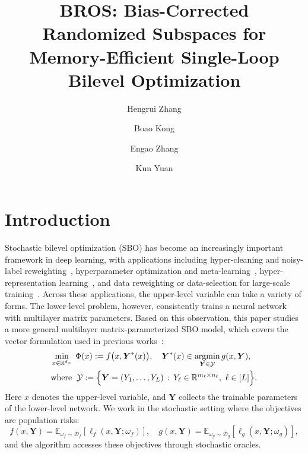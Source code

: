 \documentclass{pkumelon}
\title{BROS: Bias-Corrected Randomized Subspaces for Memory-Efficient Single-Loop Bilevel Optimization}
\author[1,*]{Hengrui Zhang}
\author[2,*]{Boao Kong}
\author[2,*]{Engao Zhang}
\author[2,\P]{Kun Yuan}
\affiliation[1]{Sichuan University}
\affiliation[2]{Peking University}
\theoremstyle{plain}
\DeclareMathOperator{\argmin}{argmin}
\begin{document}
\maketitle

\section{Introduction}
\label{sec:intro}

Stochastic bilevel optimization (SBO) has become an increasingly important framework in deep learning, with applications including hyper-cleaning and noisy-label reweighting~\citep{hao2024bilevel,yang2024tuning,tu2023learning,zheng2021meta}, hyperparameter optimization and meta-learning~\citep{franceschi2018bilevel,shaban2019truncated,chen2024optimal}, hyper-representation learning~\citep{huang2024optimal,yang2025first}, and data reweighting or data-selection for large-scale training~\citep{fan2023doge,xie2023doremi,shen2024seal,pan2025scalebio,wang2026draw}. Across these applications, the upper-level variable can take a variety of forms. The lower-level problem, however, consistently trains a neural network with multilayer matrix parameters. Based on this observation, this paper studies a more general multilayer matrix-parameterized SBO model, which covers the vector formulation used in previous works~\citep{ghadimi2018approximation,dagreou2022framework,chen2024optimal,chu2024spaba}:
\begin{subequations} \label{eq:intro-problem}
\begin{align}
  &\min_{x\in\mathbb{R}^{d_x}}\; \Phi(x) := f\bigl(x,\boldsymbol{Y}^*(x)\bigr), \quad \boldsymbol{Y}^*(x) \in \argmin_{\boldsymbol{Y}\in\mathcal{Y}} g(x,\boldsymbol{Y}), \label{eq:multi_layer_bo}\\
  &\text{where}\;\; \mathcal{Y}:=\Bigl\{\boldsymbol{Y}=(Y_1,\ldots,Y_L)\,:\, Y_\ell\in\mathbb R^{m_\ell\times n_\ell},\ \ell\in[L]\Bigr\}. \label{eq:domain_y}
\end{align}
\end{subequations}
Here $x$ denotes the upper-level variable, and $\boldsymbol{Y}$ collects the trainable parameters of the lower-level network. We work in the stochastic setting where the objectives are population risks:
\begin{equation*}
f(x,\boldsymbol Y)=\mathbb E_{\omega_f\sim\mathcal D_f}[\ell_f(x,\boldsymbol Y;\omega_f)], \quad g(x,\boldsymbol Y)=\mathbb E_{\omega_g\sim\mathcal D_g}[\ell_g(x,\boldsymbol Y;\omega_g)],
\end{equation*}
and the algorithm accesses these objectives through stochastic oracles.
\end{document}
